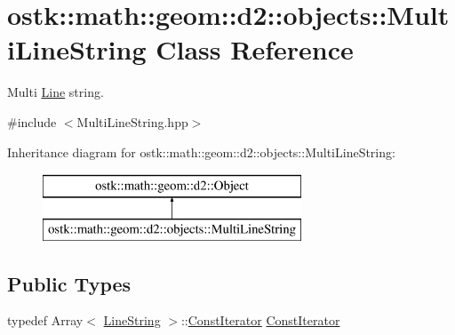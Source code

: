 \hypertarget{classostk_1_1math_1_1geom_1_1d2_1_1objects_1_1_multi_line_string}{}\section{ostk\+:\+:math\+:\+:geom\+:\+:d2\+:\+:objects\+:\+:Multi\+Line\+String Class Reference}
\label{classostk_1_1math_1_1geom_1_1d2_1_1objects_1_1_multi_line_string}


Multi \hyperlink{classostk_1_1math_1_1geom_1_1d2_1_1objects_1_1_line}{Line} string.  




{\ttfamily \#include $<$Multi\+Line\+String.\+hpp$>$}

Inheritance diagram for ostk\+:\+:math\+:\+:geom\+:\+:d2\+:\+:objects\+:\+:Multi\+Line\+String\+:\begin{figure}[H]
\begin{center}
\leavevmode
\includegraphics[height=2.000000cm]{classostk_1_1math_1_1geom_1_1d2_1_1objects_1_1_multi_line_string}
\end{center}
\end{figure}
\subsection*{Public Types}
\begin{DoxyCompactItemize}
\item 
typedef Array$<$ \hyperlink{classostk_1_1math_1_1geom_1_1d2_1_1objects_1_1_line_string}{Line\+String} $>$\+::\hyperlink{classostk_1_1math_1_1geom_1_1d2_1_1objects_1_1_multi_line_string_a43dc9419e5743d8a920141ba4fa10c5f}{Const\+Iterator} \hyperlink{classostk_1_1math_1_1geom_1_1d2_1_1objects_1_1_multi_line_string_a43dc9419e5743d8a920141ba4fa10c5f}{Const\+Iterator}
\end{DoxyCompactItemize}
